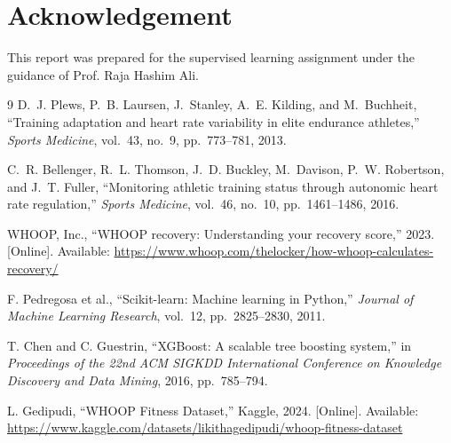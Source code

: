 \documentclass[conference]{IEEEtran}
\begin{document}
\section*{Acknowledgement}
This report was prepared for the supervised learning assignment under the guidance of Prof. Raja Hashim Ali.

\begin{thebibliography}{9}
D.~J. Plews, P.~B. Laursen, J.~Stanley, A.~E. Kilding, and M.~Buchheit,
``Training adaptation and heart rate variability in elite endurance athletes,''
\textit{Sports Medicine}, vol.~43, no.~9, pp.~773--781, 2013.

C.~R. Bellenger, R.~L. Thomson, J.~D. Buckley, M.~Davison, P.~W. Robertson, and J.~T. Fuller,
``Monitoring athletic training status through autonomic heart rate regulation,''
\textit{Sports Medicine}, vol.~46, no.~10, pp.~1461--1486, 2016.

WHOOP, Inc.,
``WHOOP recovery: Understanding your recovery score,''
2023. [Online]. Available: \url{https://www.whoop.com/thelocker/how-whoop-calculates-recovery/}

F. Pedregosa et al.,
``Scikit-learn: Machine learning in Python,''
\textit{Journal of Machine Learning Research}, vol.~12, pp.~2825--2830, 2011.

T. Chen and C. Guestrin,
``XGBoost: A scalable tree boosting system,''
in \textit{Proceedings of the 22nd ACM SIGKDD International Conference on Knowledge Discovery and Data Mining}, 2016, pp.~785--794.

L. Gedipudi,
``WHOOP Fitness Dataset,''
Kaggle, 2024. [Online]. Available: \url{https://www.kaggle.com/datasets/likithagedipudi/whoop-fitness-dataset}
\end{thebibliography}

\balance
\end{document}
